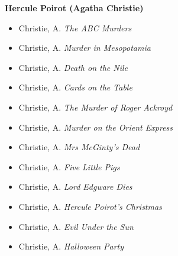 \documentclass{article}
\begin{document}
\begin{appendices}
\textbf{Hercule Poirot (Agatha Christie)}
\begin{itemize}[itemsep=0pt, parsep=0pt, topsep=2pt, partopsep=0pt]
    \item Christie, A. \textit{The ABC Murders}
    \item Christie, A. \textit{Murder in Mesopotamia}
    \item Christie, A. \textit{Death on the Nile}
    \item Christie, A. \textit{Cards on the Table}
    \item Christie, A. \textit{The Murder of Roger Ackroyd}
    \item Christie, A. \textit{Murder on the Orient Express}
    \item Christie, A. \textit{Mrs McGinty's Dead}
    \item Christie, A. \textit{Five Little Pigs}
    \item Christie, A. \textit{Lord Edgware Dies}
    \item Christie, A. \textit{Hercule Poirot's Christmas}
    \item Christie, A. \textit{Evil Under the Sun}
    \item Christie, A. \textit{Halloween Party}
\end{itemize}
\end{appendices}
\end{document}
